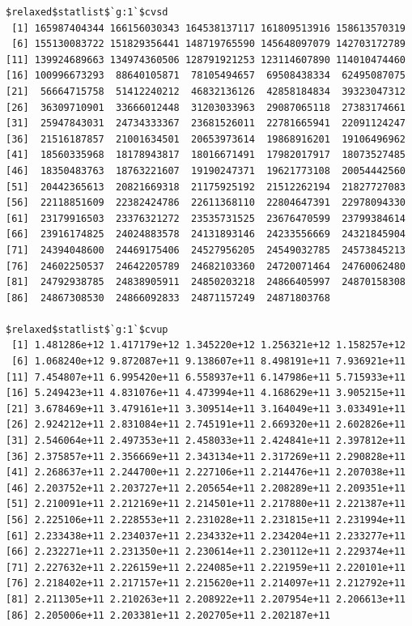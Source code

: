 \documentclass[
]{article}
\begin{document}
\begin{verbatim}
$relaxed$statlist$`g:1`$cvsd
 [1] 165987404344 166156030343 164538137117 161809513916 158613570319
 [6] 155130083722 151829356441 148719765590 145648097079 142703172789
[11] 139924689663 134974360506 128791921253 123114607890 114010474460
[16] 100996673293  88640105871  78105494657  69508438334  62495087075
[21]  56664715758  51412240212  46832136126  42858184834  39323047312
[26]  36309710901  33666012448  31203033963  29087065118  27383174661
[31]  25947843031  24734333367  23681526011  22781665941  22091124247
[36]  21516187857  21001634501  20653973614  19868916201  19106496962
[41]  18560335968  18178943817  18016671491  17982017917  18073527485
[46]  18350483763  18763221607  19190247371  19621773108  20054442560
[51]  20442365613  20821669318  21175925192  21512262194  21827727083
[56]  22118851609  22382424786  22611368110  22804647391  22978094330
[61]  23179916503  23376321272  23535731525  23676470599  23799384614
[66]  23916174825  24024883578  24131893146  24233556669  24321845904
[71]  24394048600  24469175406  24527956205  24549032785  24573845213
[76]  24602250537  24642205789  24682103360  24720071464  24760062480
[81]  24792938785  24838905911  24850203218  24866405997  24870158308
[86]  24867308530  24866092833  24871157249  24871803768

$relaxed$statlist$`g:1`$cvup
 [1] 1.481286e+12 1.417179e+12 1.345220e+12 1.256321e+12 1.158257e+12
 [6] 1.068240e+12 9.872087e+11 9.138607e+11 8.498191e+11 7.936921e+11
[11] 7.454807e+11 6.995420e+11 6.558937e+11 6.147986e+11 5.715933e+11
[16] 5.249423e+11 4.831076e+11 4.473994e+11 4.168629e+11 3.905215e+11
[21] 3.678469e+11 3.479161e+11 3.309514e+11 3.164049e+11 3.033491e+11
[26] 2.924212e+11 2.831084e+11 2.745191e+11 2.669320e+11 2.602826e+11
[31] 2.546064e+11 2.497353e+11 2.458033e+11 2.424841e+11 2.397812e+11
[36] 2.375857e+11 2.356669e+11 2.343134e+11 2.317269e+11 2.290828e+11
[41] 2.268637e+11 2.244700e+11 2.227106e+11 2.214476e+11 2.207038e+11
[46] 2.203752e+11 2.203727e+11 2.205654e+11 2.208289e+11 2.209351e+11
[51] 2.210091e+11 2.212169e+11 2.214501e+11 2.217880e+11 2.221387e+11
[56] 2.225106e+11 2.228553e+11 2.231028e+11 2.231815e+11 2.231994e+11
[61] 2.233438e+11 2.234037e+11 2.234332e+11 2.234204e+11 2.233277e+11
[66] 2.232271e+11 2.231350e+11 2.230614e+11 2.230112e+11 2.229374e+11
[71] 2.227632e+11 2.226159e+11 2.224085e+11 2.221959e+11 2.220101e+11
[76] 2.218402e+11 2.217157e+11 2.215620e+11 2.214097e+11 2.212792e+11
[81] 2.211305e+11 2.210263e+11 2.208922e+11 2.207954e+11 2.206613e+11
[86] 2.205006e+11 2.203381e+11 2.202705e+11 2.202187e+11


\end{verbatim}
\end{document}
